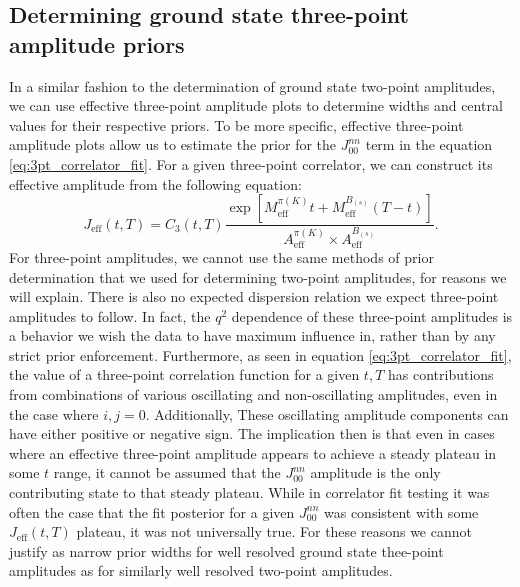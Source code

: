 \subsection{Determining ground state three-point amplitude priors}\label{sec:Amp_effs_3pt}
In a similar fashion to the determination of ground state two-point amplitudes, we can use effective three-point amplitude plots to determine widths and central values for their respective priors.  To be more specific, effective three-point amplitude plots allow us to estimate the prior for the $J_{00}^{nn}$ term in the equation \ref{eq:3pt_correlator_fit}.  For a given three-point correlator, we can construct its effective amplitude from the following equation:
\begin{equation}\label{eq:3ptVeff}
    J_{\text{eff}}(t,T) = C_3(t,T)\frac{\exp\left[{M_{\text{eff}}^{\pi(K)}t +M_{\text{eff}}^{B_{(s)}}(T-t)}\right]}{A_{\text{eff}}^{\pi(K)} \times A_{\text{eff}}^{B_{(s)}}}.
\end{equation}
For three-point amplitudes, we cannot use the same methods of prior determination that we used for determining two-point amplitudes, for reasons we will explain.  There is also no expected dispersion relation we expect three-point amplitudes to follow.  In fact, the $q^2$ dependence of these three-point amplitudes is a behavior we wish the data to have maximum influence in, rather than by any strict prior enforcement.  Furthermore, as seen in equation \ref{eq:3pt_correlator_fit}, the value of a three-point correlation function for a given $t,T$ has contributions from combinations of various oscillating and non-oscillating amplitudes, even in the case where $i,j = 0$.  Additionally, These oscillating amplitude components can have either positive or negative sign.  The implication then is that even in cases where an effective three-point amplitude appears to achieve a steady plateau in some $t$ range, it cannot be assumed that the $J_{00}^{nn}$ amplitude is the only contributing state to that steady plateau.  While in correlator fit testing it was often the case that the fit posterior for a given $J_{00}^{nn}$ was consistent with some $J_{\text{eff}}(t,T)$ plateau, it was not universally true.  For these reasons we cannot justify as narrow prior widths for well resolved ground state thee-point amplitudes as for similarly well resolved two-point amplitudes.


